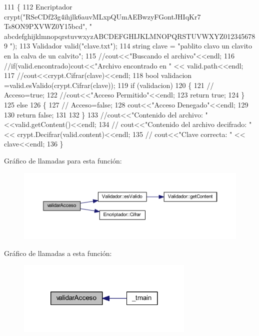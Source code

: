 \begin{DoxyCode}
111 \{
112     Encriptador crypt(\textcolor{stringliteral}{"RSeCDf23g4ihjlk6auvMLxpQUmAEBwzyFGontJHIqKr7 Ts8ON9PXVWZ0Y15bcd"}, \textcolor{stringliteral}{"
      abcdefghijklmnopqrstuvwxyzABCDEFGHIJKLMNOPQRSTUVWXYZ0123456789 "});
113     Validador valid(\textcolor{stringliteral}{"clave.txt"});
114     \textcolor{keywordtype}{string} clave = \textcolor{stringliteral}{"pablito clavo un clavito en la calva de un calvito"};
115     \textcolor{comment}{//cout<<"Buscando el archivo"<<endl;}
116     \textcolor{comment}{//if(valid.encontrado)cout<<"Archivo encontrado en " << valid.path<<endl;}
117     \textcolor{comment}{//cout<<crypt.Cifrar(clave)<<endl;}
118     \textcolor{keywordtype}{bool} validacion =valid.esValido(crypt.Cifrar(clave));
119     \textcolor{keywordflow}{if} (validacion)
120     \{
121         \textcolor{comment}{//      Acceso=true;}
122         \textcolor{comment}{//cout<<"Acceso Permitido"<<endl;}
123         \textcolor{keywordflow}{return} \textcolor{keyword}{true};
124     \}
125     \textcolor{keywordflow}{else}
126     \{
127         \textcolor{comment}{//      Acceso=false;}
128         cout<<\textcolor{stringliteral}{"Acceso Denegado"}<<endl;
129 
130         \textcolor{keywordflow}{return} \textcolor{keyword}{false};
131 
132     \}
133     \textcolor{comment}{//cout<<"Contenido del archivo: "<<valid.getContent()<<endl;}
134     \textcolor{comment}{//  cout<<"Contenido del archivo decifrado: " << crypt.Decifrar(valid.content)<<endl;}
135     \textcolor{comment}{//  cout<<"Clave correcta: " << clave<<endl;}
136 \}
\end{DoxyCode}


Gráfico de llamadas para esta función\-:
\nopagebreak
\begin{figure}[H]
\begin{center}
\leavevmode
\includegraphics[width=350pt]{_encriptador_8h_a514eeb9d37c47513308d43f3ddcb5d66_cgraph}
\end{center}
\end{figure}




Gráfico de llamadas a esta función\-:
\nopagebreak
\begin{figure}[H]
\begin{center}
\leavevmode
\includegraphics[width=240pt]{_encriptador_8h_a514eeb9d37c47513308d43f3ddcb5d66_icgraph}
\end{center}
\end{figure}


